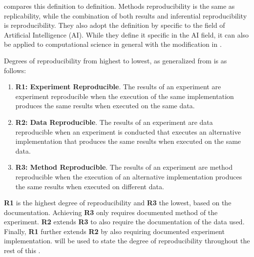 \citet{gundersenStateArtReproducibility2018} compares this definition to \citeauthor{drummondReplicabilityNotReproducibility2009} definition.
Methods reproducibility is the same as replicability, while the combination of both results and inferential reproducibility is reproducibility.
They also adopt the definition by \citet{goodmanWhatDoesResearch2016} specific to the field of Artificial Intelligence (AI).
While they define it specific in the AI field, it can also be applied to computational science in general with the modification in .

\begin{mydef}[Reproducibility]
	\label{def:reproducibility}
	Degrees of reproducibility from highest to lowest, as generalized from \citet{gundersenStateArtReproducibility2018} is as follows:
	\begin{enumerate}
		\item \textbf{R1: Experiment Reproducible}. The results of an experiment are experiment reproducible when the execution of the same implementation produces the same results when executed on the same data.
		\item \textbf{R2: Data Reproducible}. The results of an experiment are data reproducible when an experiment is conducted that executes an alternative implementation that produces the same results when executed on the same data.
		\item \textbf{R3: Method Reproducible}. The results of an experiment are method reproducible when the execution of an alternative implementation produces the same results when executed on different data.
	\end{enumerate}
\end{mydef}


\textbf{R1} is the highest degree of reproducibility and \textbf{R3} the lowest, based on the documentation.
Achieving \textbf{R3} only requires documented method of the experiment.
\textbf{R2} extends \textbf{R3} to also require the documentation of the data used.
Finally, \textbf{R1} further extends \textbf{R2} by also requiring documented experiment implementation.
 will be used to state the degree of reproducibility throughout the rest of this \MakeLowercase{\type}.


